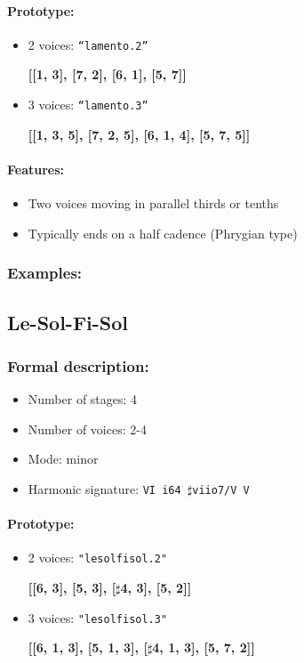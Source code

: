 \documentclass[11pt, openany]{article}
\begin{document}
\paragraph{Prototype:}
\begin{itemize}
\item 2 voices: \texttt{“lamento.2”}
	\begin{center}
	\textbf{[[1, 3], [7, 2], [6, 1], [5, 7]]}
	\end{center}
\item 3 voices: \texttt{“lamento.3”}
	\begin{center}
	\textbf{[[1, 3, 5], [7, 2, 5], [6, 1, 4], [5, 7, 5]]}
	\end{center}
\end{itemize}

\paragraph{Features:}
\begin{itemize}
\item Two voices moving in parallel thirds or tenths
\item Typically ends on a half cadence (Phrygian type)
\end{itemize}

\subsubsection{Examples:}


	\subsection{Le-Sol-Fi-Sol}
	
\subsubsection{Formal description:}
\begin{itemize}
\item Number of stages: 4
\item Number of voices: 2-4
\item Mode: minor
\item Harmonic signature: \texttt{VI i64 $\sharp$viio7/V V}
\end{itemize}

\paragraph{Prototype:}
\begin{itemize}
\item 2 voices: \texttt{"lesolfisol.2"}
	\begin{center}
	\textbf{[[6, 3], [5, 3], [$\sharp$4, 3], [5, 2]]}
	\end{center}
\item 3 voices: \texttt{"lesolfisol.3"}
	\begin{center}
	\textbf{[[6, 1, 3], [5, 1, 3], [$\sharp$4, 1, 3], [5, 7, 2]]}
	\end{center}
\end{itemize}
\end{document}

